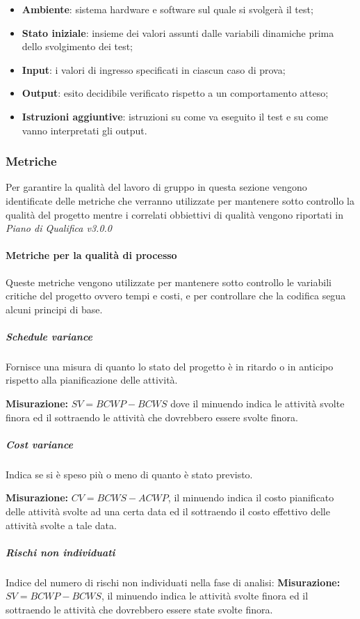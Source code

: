 \begin{itemize}
	\item \textbf{Ambiente}: sistema hardware e software sul quale si svolgerà il test;
	\item \textbf{Stato iniziale}: insieme dei valori assunti dalle variabili dinamiche prima dello svolgimento dei test;
	\item \textbf{Input}: i valori di ingresso specificati in ciascun caso di prova;
	\item \textbf{Output}: esito decidibile verificato rispetto a un comportamento atteso;
	\item \textbf{Istruzioni aggiuntive}: istruzioni su come va eseguito il test e su come vanno interpretati gli output.
\end{itemize}
\subsubsection{Metriche}
\label{sec:metriche}
Per garantire la qualità del lavoro di gruppo in questa sezione vengono identificate delle metriche che verranno utilizzate per mantenere sotto controllo la qualità del progetto mentre i correlati obbiettivi di qualità vengono riportati in \textit{Piano di Qualifica v3.0.0} 
\paragraph{Metriche per la qualità di processo} \Spazio
Queste metriche vengono utilizzate per mantenere sotto controllo le variabili critiche del progetto ovvero tempi e costi, e per controllare che la codifica segua alcuni principi di base. 

\subparagraph{Schedule variance} \Spazio
Fornisce una misura di quanto lo stato del progetto è in ritardo o in anticipo rispetto alla pianificazione delle attività.

\textbf{Misurazione: }$SV = BCWP - BCWS$ dove il minuendo indica le attività svolte finora ed il sottraendo le attività che dovrebbero essere svolte finora.


\subparagraph{Cost variance} \Spazio
Indica se si è speso più o meno di quanto è stato previsto.

 \textbf{Misurazione: }$CV = BCWS - ACWP$, il minuendo indica il costo pianificato delle attività svolte ad una certa data ed il sottraendo il costo effettivo delle attività svolte a tale data.

\subparagraph{Rischi non individuati} \Spazio
Indice del numero di rischi non individuati nella fase di analisi:
\textbf{Misurazione: }$SV = BCWP - BCWS$, il minuendo indica le attività svolte finora ed il sottraendo le attività che dovrebbero essere state svolte finora.

